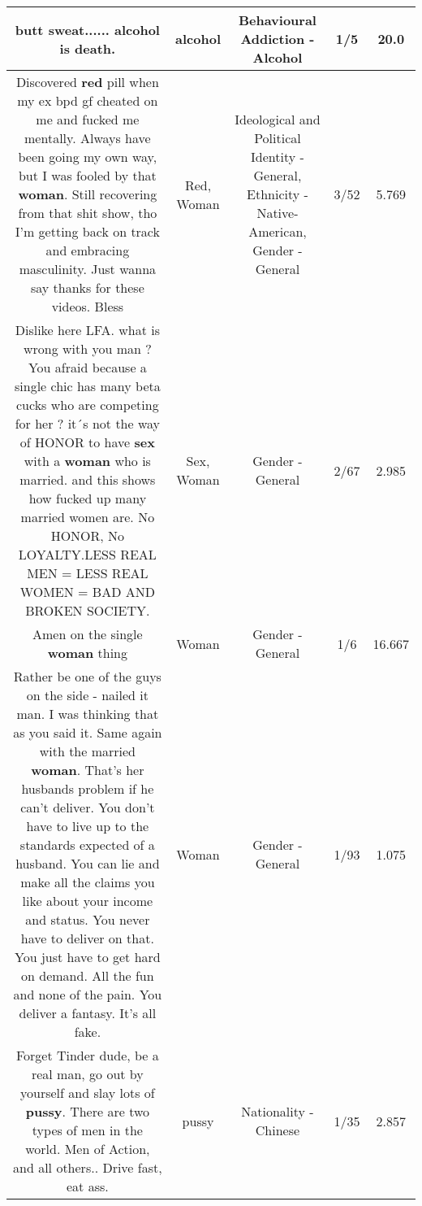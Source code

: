 \documentclass[11pt]{article}
\newlength\mylength
\begin{document}
\begin{center}
\begin{longtable}{|C{.65\mylength}|C{.30\mylength}|C{.12\mylength}|C{.12\mylength}|C{.12\mylength}|}
  \small butt sweat...... \textbf{alcohol} is death.\normalsize   & alcohol & Behavioural Addiction - Alcohol & 1/5 & 20.0 \\  \hline
  \small Discovered \textbf{r\textbf{ed}} pill when my ex bpd gf cheated on me and fucked me mentally. Always have been going my own way, but I was fooled by that \textbf{woman}. Still recovering from that shit show, tho I'm getting back on track and embracing masculinity. Just wanna say thanks for these videos. Bless\normalsize   & Red, Woman &  Ideological and Political Identity - General, Ethnicity - Native-American, Gender - General & 3/52 & 5.769 \\  \hline
  \small Dislike here LFA. what is wrong with you man ?  You afraid because a single chic has many beta cucks who are competing for her ?  it´s not the way of HONOR to have \textbf{sex} with a \textbf{woman} who is married. and this shows  how fucked up many married women are. No HONOR, No LOYALTY.LESS REAL MEN = LESS REAL WOMEN = BAD AND BROKEN SOCIETY.\normalsize   & Sex, Woman & Gender - General & 2/67 & 2.985 \\  \hline
  \small Amen on the single \textbf{woman} thing\normalsize   & Woman & Gender - General & 1/6 & 16.667 \\  \hline
  \small Rather be one of the guys on the side - nailed it man. I was thinking that as you said it. Same again with the married \textbf{woman}. That's her husbands problem if he can't deliver. You don't have to live up to the standards expected of a husband. You can lie and make all the claims you like about your income and status. You never have to deliver on that. You just have to get hard on demand. All the fun and none of the pain. You deliver a fantasy. It's all fake.\normalsize   & Woman & Gender - General & 1/93 & 1.075 \\  \hline
  \small Forget Tinder dude, be a real man, go out by yourself and slay lots of \textbf{pussy}. There are two types of men in the world. Men of Action, and all others.. Drive fast, eat ass.\normalsize   & pussy & Nationality - Chinese & 1/35 & 2.857 \\  \hline

\end{longtable}
\end{center}
\end{document}

